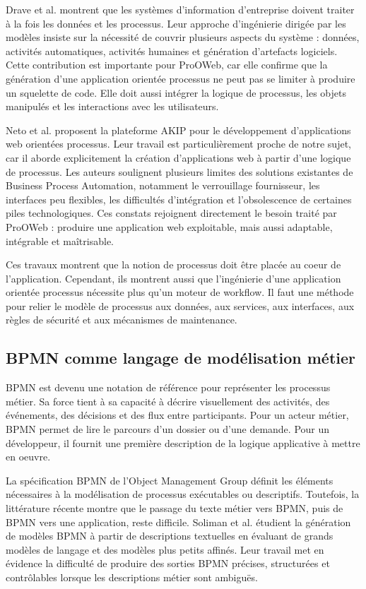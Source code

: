 \documentclass[12pt,a4paper]{article}
\begin{document}
Drave et al. \cite{drave2022} montrent que les systèmes d'information d'entreprise doivent traiter à la fois les données et les processus. Leur approche d'ingénierie dirigée par les modèles insiste sur la nécessité de couvrir plusieurs aspects du système : données, activités automatiques, activités humaines et génération d'artefacts logiciels. Cette contribution est importante pour ProOWeb, car elle confirme que la génération d'une application orientée processus ne peut pas se limiter à produire un squelette de code. Elle doit aussi intégrer la logique de processus, les objets manipulés et les interactions avec les utilisateurs.

Neto et al. \cite{neto2022} proposent la plateforme AKIP pour le développement d'applications web orientées processus. Leur travail est particulièrement proche de notre sujet, car il aborde explicitement la création d'applications web à partir d'une logique de processus. Les auteurs soulignent plusieurs limites des solutions existantes de Business Process Automation, notamment le verrouillage fournisseur, les interfaces peu flexibles, les difficultés d'intégration et l'obsolescence de certaines piles technologiques. Ces constats rejoignent directement le besoin traité par ProOWeb : produire une application web exploitable, mais aussi adaptable, intégrable et maîtrisable.

Ces travaux montrent que la notion de processus doit être placée au coeur de l'application. Cependant, ils montrent aussi que l'ingénierie d'une application orientée processus nécessite plus qu'un moteur de workflow. Il faut une méthode pour relier le modèle de processus aux données, aux services, aux interfaces, aux règles de sécurité et aux mécanismes de maintenance.

\subsection{BPMN comme langage de modélisation métier}

BPMN est devenu une notation de référence pour représenter les processus métier. Sa force tient à sa capacité à décrire visuellement des activités, des événements, des décisions et des flux entre participants. Pour un acteur métier, BPMN permet de lire le parcours d'un dossier ou d'une demande. Pour un développeur, il fournit une première description de la logique applicative à mettre en oeuvre.

La spécification BPMN de l'Object Management Group \cite{omgBpmn} définit les éléments nécessaires à la modélisation de processus exécutables ou descriptifs. Toutefois, la littérature récente montre que le passage du texte métier vers BPMN, puis de BPMN vers une application, reste difficile. Soliman et al. \cite{soliman2025} étudient la génération de modèles BPMN à partir de descriptions textuelles en évaluant de grands modèles de langage et des modèles plus petits affinés. Leur travail met en évidence la difficulté de produire des sorties BPMN précises, structurées et contrôlables lorsque les descriptions métier sont ambiguës.
\end{document}
